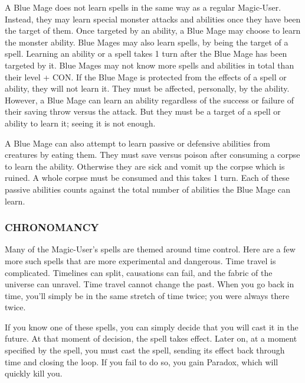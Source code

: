 \documentclass[twoside]{article}
\begin{document}
A Blue Mage does not learn spells in the same way as a regular Magic-User. Instead, they may learn special monster attacks and abilities once they have been the target of them. Once targeted by an ability, a Blue Mage may choose to learn the monster ability. Blue Mages may also learn spells, by being the target of a spell. Learning an ability or a spell takes 1 turn after the Blue Mage has been targeted by it. Blue Mages may not know more spells and abilities in total than their level + CON. If the Blue Mage is protected from the effects of a spell or ability, they will not learn it. They must be affected, personally, by the ability. However, a Blue Mage can learn an ability regardless of the success or failure of their saving throw versus the attack. But they must be a target of a spell or ability to learn it; seeing it is not enough.

\bigbreak

A Blue Mage can also attempt to learn passive or defensive abilities from creatures by eating them. They must save versus poison after consuming a corpse to learn the ability. Otherwise they are sick and vomit up the corpse which is ruined. A whole corpse must be consumed and this takes 1 turn. Each of these passive abilities counts against the total number of abilities the Blue Mage can learn.

\subsubsection*{\footnotesize{C}\scriptsize{HRONOMANCY}\normalsize}

Many of the Magic-User's spells are themed around time control. Here are a few more such spells that are more experimental and dangerous. Time travel is complicated. Timelines can split, causations can fail, and the fabric of the universe can unravel. Time travel cannot change the past. When you go back in time, you'll simply be in the same stretch of time twice; you were always there twice.

\bigbreak

If you know one of these spells, you can simply decide that you will cast it in the future. At that moment of decision, the spell takes effect. Later on, at a moment specified by the spell, you must cast the spell, sending its effect back through time and closing the loop. If you fail to do so, you gain Paradox, which will quickly kill you.
\end{document}

